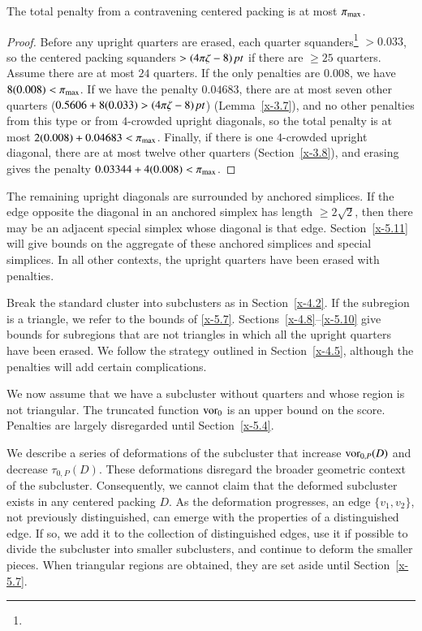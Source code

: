\begin{lemma}
The total penalty from a contravening centered packing is at most
$\pi_{\max}$.
\end{lemma}

\begin{proof}
Before any upright quarters are erased, each quarter
squanders\footnote{} %
$>0.033$, so the centered packing squanders $>(4\pi\zeta-8)\,\hbox{\it pt}$ if there
are $\ge25$ quarters.  Assume there are at most $24$ quarters. If
the only penalties are $0.008$, we have $8(0.008)<\pi_{\max}$. If we
have the penalty $0.04683$, there are at most seven other quarters
($0.5606+8(0.033)>(4\pi\zeta-8)\,\hbox{\it pt}$) (Lemma~\ref{x-3.7}), and no other
penalties from this type or from $4$-crowded upright diagonals, so
the total penalty is at most $2(0.008)+ 0.04683 < \pi_{\max}$.
Finally, if there is one $4$-crowded upright diagonal, there are
at most twelve other quarters (Section~\ref{x-3.8}), and erasing
gives the penalty $0.03344+4 (0.008)<\pi_{\max}$.
\end{proof}

The remaining upright diagonals are surrounded by anchored simplices. If
the edge opposite the diagonal in an anchored simplex has length
$\ge2\sqrt2$, then there may be an adjacent special simplex whose
diagonal is that edge.  Section~\ref{x-5.11} will give bounds on the
aggregate of these anchored simplices and special simplices.  In all
other contexts, the upright quarters have been erased with penalties.

Break the standard cluster into subclusters as in Section~\ref{x-4.2}.
If the subregion is a triangle, we refer to the bounds of \ref{x-5.7}.
Sections~\ref{x-4.8}--\ref{x-5.10} give bounds for subregions that are
not triangles in which all the upright quarters have been erased. We
follow the strategy outlined in Section~\ref{x-4.5}, although the
penalties will add certain complications.

We now assume that we have a subcluster without quarters and whose
region is not triangular.  The truncated function $\operatorname{vor}_0$ is an
upper bound on the score.  Penalties are largely disregarded until
Section~\ref{x-5.4}.

We describe a series of deformations of the subcluster that
increase $\operatorname{vor}_{0,P}(D)$ and decrease $\tau_{0,P}(D)$.  These
deformations disregard the broader geometric context of the
subcluster. Consequently, we cannot claim that the deformed
subcluster exists in any centered packing $D$.  As the deformation
progresses, an edge $\{v_1,v_2\}$, not previously distinguished,
can emerge with the properties of a distinguished edge. If so, we
add it to the collection of distinguished edges, use it if
possible to divide the subcluster into smaller subclusters, and
continue to deform the smaller pieces.  When triangular regions
are obtained, they are set aside until Section~\ref{x-5.7}.

